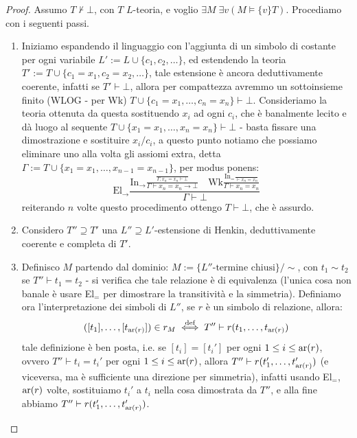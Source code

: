 \begin{proof}
    Assumo $T \nvdash \bot$, con $T$ $L$-teoria, e voglio $\exists M\;\exists v (M \models \{v\}T)$. Procediamo con i seguenti passi.
    \begin{enumerate}
        \item Iniziamo espandendo il linguaggio con l'aggiunta di un simbolo di costante per ogni variabile $L' := L \cup \{c_1,c_2,\ldots\}$, ed estendendo la teoria $T' := T \cup \{c_1 = x_1, c_2 = x_2, \ldots\}$, tale estensione è ancora deduttivamente coerente, infatti se $T' \vdash \bot$, allora per compattezza avremmo un sottoinsieme finito 
        (WLOG - per Wk) $T \cup \{c_1 = x_1, \ldots, c_n = x_n\} \vdash \bot$. Consideriamo la teoria ottenuta da questa sostituendo $x_i$ ad ogni $c_i$, che è banalmente lecito e dà luogo al sequente $T \cup \{x_1 = x_1, \ldots, x_n = x_n\} \vdash \bot$ - basta fissare una dimostrazione e sostituire $x_i/c_i$,
        a questo punto notiamo che possiamo eliminare uno alla volta gli assiomi extra, detta $\Gamma := T \cup \{x_1 = x_1, \ldots, x_{n-1} = x_{n-1}\}$, per modus ponens:
        \[ \text{El}_\to \frac{\displaystyle \text{In}_\to\frac{\displaystyle \frac{}{\Gamma, x_n = x_n \vdash \bot}}{\Gamma \vdash x_n = x_n \to \bot}\quad \text{Wk}\frac{\displaystyle\text{In}_=\frac{}{\vdash x_n = x_n}}{\Gamma \vdash x_n = x_n}}{\Gamma \vdash \bot}\]
        reiterando $n$ volte questo procedimento ottengo $T \vdash \bot$, che è assurdo.
        \item Considero $T'' \supseteq T'$ una $L''\supseteq L'$-estensione di Henkin, deduttivamente coerente e completa di $T'$.
        \item Definisco $M$ partendo dal dominio: $M := \{\text{$L''$-termine chiusi}\}/\sim$, con $t_1 \sim t_2$ se $T'' \vdash t_1 = t_2$ - si verifica che tale relazione è di equivalenza (l'unica cosa non banale è usare El$_=$ per dimostrare la transitività e la simmetria).
        Definiamo ora l'interpretazione dei simboli di $L''$, se $r$ è un simbolo di relazione, allora:
        \[ ([t_1],\ldots,[t_{\operatorname{ar}(r)}]) \in r_M \overset{\text{def}}{\iff} T'' \vdash r(t_1,\ldots,t_{\operatorname{ar}(r)}) \]
        tale definizione è ben posta, i.e. se  $[t_i] = [t_i']$ per ogni $1 \leq i \leq \operatorname{ar}(r)$, ovvero $T'' \vdash t_i = t_i'$ per ogni $1 \leq i \leq \operatorname{ar}(r)$, allora $T'' \vdash r(t_1',\ldots,t_{\operatorname{ar}(r)}')$ (e viceversa, ma è sufficiente una direzione per simmetria), infatti usando El$_=$, $\operatorname{ar}(r)$ volte, sostituiamo $t_i'$ a $t_i$ nella cosa dimostrata da $T''$, e alla fine abbiamo $T'' \vdash r(t_1',\ldots,t_{\operatorname{ar}(r)}')$.\\

\end{enumerate}
\end{proof}
